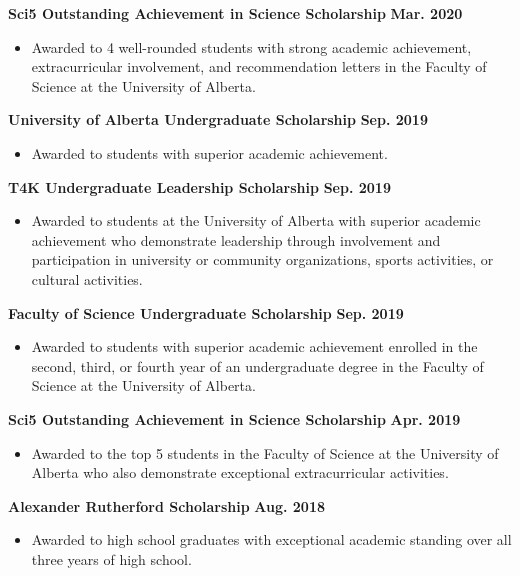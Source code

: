 \documentclass{article}
\begin{document}
    \textbf{Sci5 Outstanding Achievement in Science Scholarship} \hfill \textbf{Mar. 2020}
    \begin{itemize}
        \item Awarded to 4 well-rounded students with strong academic achievement, extracurricular involvement, and recommendation letters in the Faculty of Science at the University of Alberta.
    \end{itemize}

    \textbf{University of Alberta Undergraduate Scholarship} \hfill \textbf{Sep. 2019}
        \begin{itemize}
            \item Awarded to students with superior academic achievement.
        \end{itemize}

    \textbf{T4K Undergraduate Leadership Scholarship} \hfill \textbf{Sep. 2019}
        \begin{itemize}
            \item Awarded to students at the University of Alberta with superior academic achievement who demonstrate leadership through involvement and participation in university or community organizations, sports activities, or cultural activities.
        \end{itemize}

    \textbf{Faculty of Science Undergraduate Scholarship} \hfill \textbf{Sep. 2019}
        \begin{itemize}
            \item Awarded to students with superior academic achievement enrolled in the second, third, or fourth year of an undergraduate degree in the Faculty of Science at the University of Alberta.
        \end{itemize}

    \textbf{Sci5 Outstanding Achievement in Science Scholarship} \hfill \textbf{Apr. 2019}
        \begin{itemize}
            \item Awarded to the top 5 students in the Faculty of Science at the University of Alberta who also demonstrate exceptional extracurricular activities.
        \end{itemize}

    \textbf{Alexander Rutherford Scholarship} \hfill \textbf{Aug. 2018}
        \begin{itemize}
            \item Awarded to high school graduates with exceptional academic standing over all three years of high school.
        \end{itemize}
\end{document}

